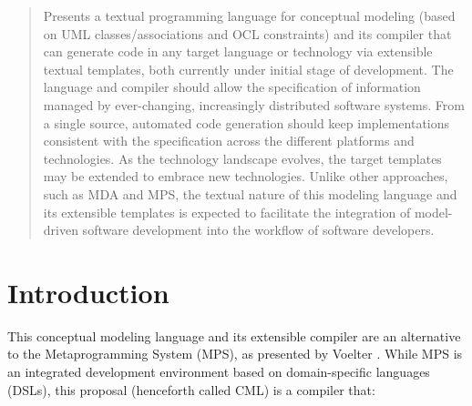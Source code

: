 \documentclass[a0,portrait]{a0poster}
\begin{document}
\begin{multicols}{3} %


\color{Navy} %

\begin{abstract}

Presents a textual programming language for conceptual modeling
(based on UML classes/associations and OCL constraints)
and its compiler that can generate code in any target language or technology
via extensible textual templates,
both currently under initial stage of development.
The language and compiler should allow the specification of information
managed by ever-changing, increasingly distributed software systems.
From a single source,
automated code generation should keep implementations consistent with the specification
across the different platforms and technologies.
As the technology landscape evolves,
the target templates may be extended to embrace new technologies.
Unlike other approaches,
such as MDA and MPS,
the textual nature of this modeling language and its extensible templates
is expected to facilitate the integration of model-driven software development
into the workflow of software developers.

\end{abstract}



\color{SaddleBrown} %

\section*{Introduction}

This conceptual modeling language and its extensible compiler
are an alternative to the Metaprogramming System (MPS),
as presented by Voelter \cite{voelter}.
While MPS is an integrated development environment
based on domain-specific languages (DSLs),
this proposal (henceforth called CML) is a compiler that:


\end{multicols}
\end{document}
